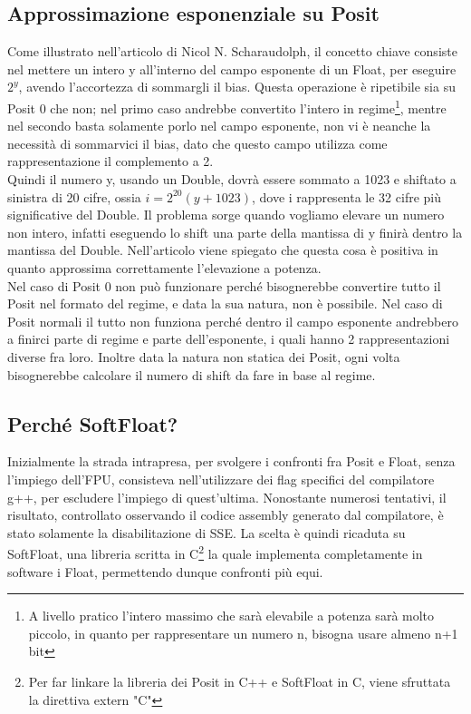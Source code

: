 \documentclass[a4paper,11pt]{article}
\begin{document}
\subsection{Approssimazione esponenziale su Posit}
Come illustrato nell'articolo di Nicol N. Scharaudolph, il concetto chiave consiste nel mettere un intero y all'interno del campo esponente di un Float, per eseguire $2^{y}$, avendo l'accortezza di sommargli il bias. Questa operazione è ripetibile sia su Posit 0 che non; nel primo caso andrebbe convertito l'intero in regime\footnote{A livello pratico l'intero massimo che sarà elevabile a potenza sarà molto piccolo, in quanto per rappresentare un numero n, bisogna usare almeno n+1 bit}, mentre nel secondo basta solamente porlo nel campo esponente, non vi è neanche la necessità di sommarvici il bias, dato che questo campo utilizza come rappresentazione il complemento a 2.\\
Quindi il numero y, usando un Double, dovrà essere sommato a 1023 e shiftato a sinistra di 20 cifre, ossia $i = 2^{20}(y+1023)$, dove i rappresenta le 32 cifre più significative del Double.
Il problema sorge quando vogliamo elevare un numero non intero, infatti eseguendo lo shift una parte della mantissa di y finirà dentro la mantissa del Double. Nell'articolo viene spiegato che questa cosa è positiva in quanto approssima correttamente l'elevazione a potenza. \\Nel caso di Posit 0 non può funzionare perché bisognerebbe convertire tutto il Posit nel formato del regime, e data la sua natura, non è possibile. Nel caso di Posit normali il tutto non funziona perché dentro il campo esponente andrebbero a finirci parte di regime e parte dell'esponente, i quali hanno 2 rappresentazioni diverse fra loro.
Inoltre data la natura non statica dei Posit, ogni volta bisognerebbe calcolare il numero di shift da fare in base al regime.

\subsection{Perché SoftFloat?}
Inizialmente la strada intrapresa, per svolgere i confronti fra Posit e Float, senza l'impiego dell'FPU, consisteva nell'utilizzare dei flag specifici del compilatore g++, per escludere l'impiego di quest'ultima. Nonostante numerosi tentativi, il risultato, controllato osservando il codice assembly generato dal compilatore, è stato solamente la disabilitazione di SSE. La scelta è quindi ricaduta su SoftFloat, una libreria scritta in C\footnote{Per far linkare la libreria dei Posit in C++ e SoftFloat in C, viene sfruttata la direttiva extern "C"} la quale implementa completamente in software i Float, permettendo dunque confronti più equi.

\newpage
	
	\printbibliography[title=Bibliografia]

	
\end{document}
